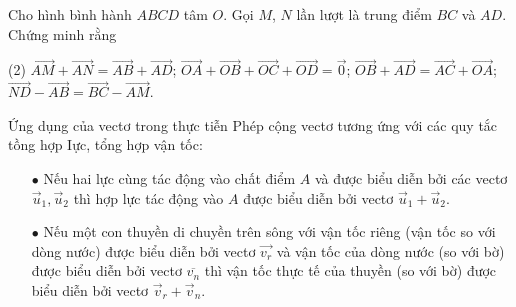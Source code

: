 \begin{bt}
Cho hình bình hành $ABCD$ tâm $O$. Gọi $M$, $N$ lần lượt là trung điểm $BC$ và $AD$. Chứng minh rằng
\begin{tasks}(2)
	\task $\overrightarrow{AM}+\overrightarrow{AN}=\overrightarrow{AB}+\overrightarrow{AD}$;
	\task $\overrightarrow{OA}+\overrightarrow{OB}+\overrightarrow{OC}+\overrightarrow{OD}=\overrightarrow{0}$;
	\task $\overrightarrow{OB}+\overrightarrow{AD}=\overrightarrow{AC}+\overrightarrow{OA}$;
	\task  $\overrightarrow{ND}-\overrightarrow{AB}=\overrightarrow{BC}-\overrightarrow{AM}$.
\end{tasks}
\end{bt} 
\begin{dang}{Ứng dụng của vectơ trong thực tiễn}
		Phép cộng vectơ tương ứng với các quy tắc tồng hợp Iực, tổng hợp vận tốc:
\begin{itemize}
	\item [$\bullet$] Nếu hai lực cùng tác động vào chất điểm $A$ và được biểu diễn bởi các vectơ $\vec{u}_{1}, \vec{u}_{2}$ thì hợp lực tác động vào $A$ được biểu diễn bởi vectơ $\vec{u}_{1}+\vec{u}_{2}$.
	\item [$\bullet$] Nếu một con thuyền di chuyền trên sông với vận tốc riêng (vận tốc so với dòng nước) được biểu diễn bởi vectơ $\overrightarrow{v_{r}}$ và vận tốc của dòng nước (so với bờ) được biểu diễn bởi vectơ $\overline{v_{n}}$ thì vận tốc thực tế của thuyền (so với bờ) được biểu diễn bởi vectơ $\vec{v}_{r}+\vec{v}_{n}$.
\end{itemize}
\end{dang}
\viduminhhoa
\begin{vd}
\end{vd}

